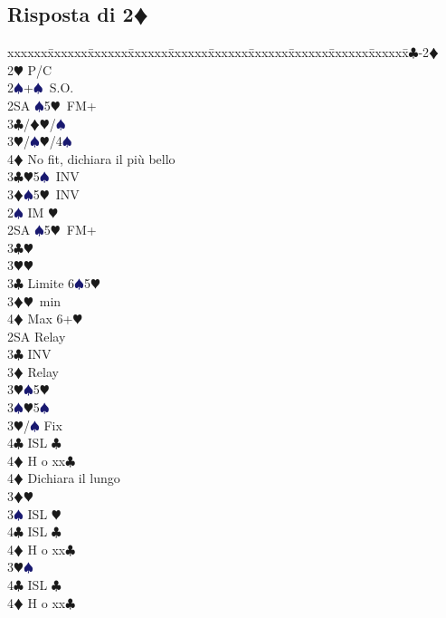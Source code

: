 \documentclass[a4paper,italian]{article}
\newcommand{\BC}{\textcolor{OliveGreen}{$\clubsuit$}}
\newcommand{\BD}{\textcolor{RedOrange}{$\vardiamondsuit$}}
\newcommand{\BH}{\textcolor{Red2}{$\varheartsuit${}}}
\newcommand{\BS}{\textcolor{MidnightBlue}{$\spadesuit${}}}
\newcommand{\pdfd}{\texorpdfstring{\BD{}}{D}}
\newenvironment{bidtable}
{\begin{tabbing}

    xxxxxx\=xxxxxx\=xxxxxx\=xxxxxx\=xxxxxx\=xxxxxx\=xxxxxx\=xxxxxx\=xxxxxx\=xxxxxx\=\kill}
{\end{tabbing} }%
\begin{document}
\begin{multicols}{2}

    \subsection{Risposta di 2\pdfd}

    \begin{bidtable}
        1\BC-2\BD\+\\
        2\BH \> P/C\+\\
        2\BS {}+\BS\ S.O.\\
        2SA \BS 5\BH\ FM+\+\\
        3\BC/\BD {}\BH /\BS \\
        3\BH/\BS {}\BH /4\BS \\
        4\BD \> No fit, dichiara il più bello\-\\
        3\BC {}\BH 5\BS\ INV\\
        3\BD {}\BS 5\BH\ INV\-\\
        2\BS \> IM \BH \+\\
        2SA \BS 5\BH\ FM+\+\\
        3\BC {}\BH \\
        3\BH {}\BH \-\\
        3\BC \> Limite 6\BS 5\BH \\
        3\BD {}\BH\ min\\
        4\BD \> Max 6+\BH \-\\
        2SA \> Relay\+\\
        3\BC {} INV\+\\
        3\BD \> Relay\+\\
        3\BH {}\BS 5\BH \\
        3\BS {}\BH 5\BS \-\\
        3\BH/\BS \> Fix\\
        4\BC \> ISL \BC \+\\
        4\BD \> H o xx\BC \-\\
        4\BD \> Dichiara il lungo\-\\
        3\BD {}\BH \+\\
        3\BS \> ISL \BH \\
        4\BC \> ISL \BC \+\\
        4\BD \> H o xx\BC \-\-\\
        3\BH {}\BS \+\\
        4\BC \> ISL \BC \+\\
        4\BD \> H o xx\BC \-\\

\end{bidtable}
\end{multicols}
\end{document}
